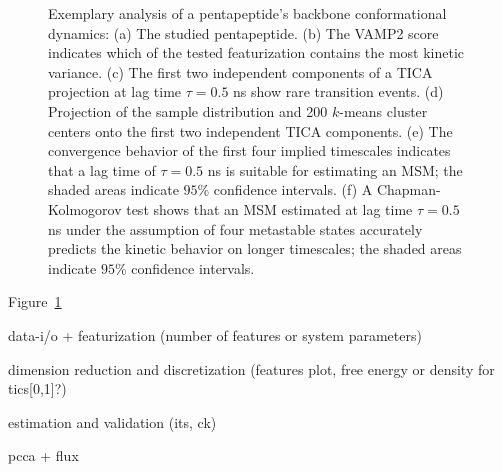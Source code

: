\documentclass[9pt,tutorial,lineno,onehalfspacing]{livecoms}
\begin{document}
\begin{figure}
\caption{Exemplary analysis of a pentapeptide's backbone conformational dynamics: (a) The studied pentapeptide. (b) The VAMP2 score indicates which of the tested featurization contains the most kinetic variance. (c) The first two independent components of a TICA projection at lag time $\tau=0.5$ ns show rare transition events. (d) Projection of the sample distribution and 200 $k$-means cluster centers onto the first two independent TICA components. (e) The convergence behavior of the first four implied timescales indicates that a lag time of $\tau=0.5$ ns is suitable for estimating an MSM; the shaded areas indicate $95\%$ confidence intervals. (f) A Chapman-Kolmogorov test shows that an MSM estimated at lag time $\tau=0.5$ ns under the assumption of four metastable states accurately predicts the kinetic behavior on longer timescales; the shaded areas indicate $95\%$ confidence intervals.}
\label{fig:io-to-its}
\end{figure}

Figure~\ref{fig:io-to-its}




data-i/o + featurization (number of features or system parameters)

dimension reduction and discretization (features plot, free energy or density for tics[0,1]?)

estimation and validation (its, ck)

pcca + flux
\end{document}
